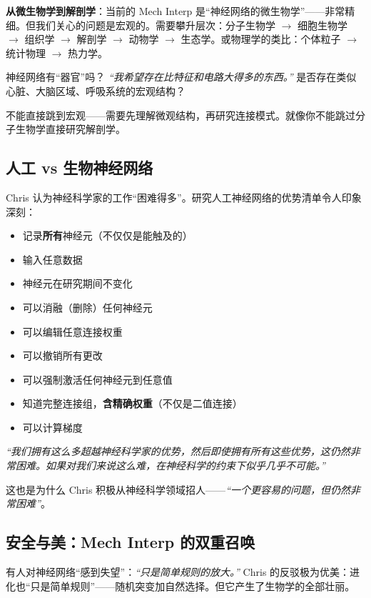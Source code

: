 \documentclass[a4paper]{article}
\begin{document}
\textbf{从微生物学到解剖学}：当前的 Mech Interp 是``神经网络的微生物学''——非常精细。但我们关心的问题是宏观的。需要攀升层次：分子生物学 $\to$ 细胞生物学 $\to$ 组织学 $\to$ 解剖学 $\to$ 动物学 $\to$ 生态学。或物理学的类比：个体粒子 $\to$ 统计物理 $\to$ 热力学。

\begin{knowledgebox}{神经网络有``器官''吗？}
\textit{``我希望存在比特征和电路大得多的东西。''} 是否存在类似心脏、大脑区域、呼吸系统的宏观结构？

不能直接跳到宏观——需要先理解微观结构，再研究连接模式。就像你不能跳过分子生物学直接研究解剖学。
\end{knowledgebox}

\subsection{人工 vs 生物神经网络}

Chris 认为神经科学家的工作``困难得多''。研究人工神经网络的优势清单令人印象深刻：

\begin{itemize}
    \item 记录\textbf{所有}神经元（不仅仅是能触及的）
    \item 输入任意数据
    \item 神经元在研究期间不变化
    \item 可以消融（删除）任何神经元
    \item 可以编辑任意连接权重
    \item 可以撤销所有更改
    \item 可以强制激活任何神经元到任意值
    \item 知道完整连接组，\textbf{含精确权重}（不仅是二值连接）
    \item 可以计算梯度
\end{itemize}

\textit{``我们拥有这么多超越神经科学家的优势，然后即使拥有所有这些优势，这仍然非常困难。如果对我们来说这么难，在神经科学的约束下似乎几乎不可能。''}

这也是为什么 Chris 积极从神经科学领域招人——\textit{``一个更容易的问题，但仍然非常困难''}。

\subsection{安全与美：Mech Interp 的双重召唤}

有人对神经网络``感到失望''：\textit{``只是简单规则的放大。''} Chris 的反驳极为优美：进化也``只是简单规则''——随机突变加自然选择。但它产生了生物学的全部壮丽。
\end{document}

